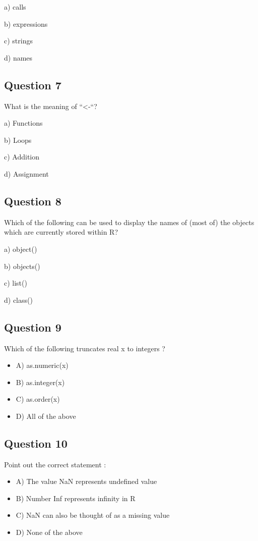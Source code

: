 \documentclass[11pt]{article}
\begin{document}
a) calls

b) expressions

c) strings

d) names

\subsection*{Question 7}
\label{sec:org28e303a}
What is the meaning of “<-“?

a) Functions

b) Loops

c) Addition

d) Assignment

\subsection*{Question 8}
\label{sec:orgcea9f26}
Which of the following can be used to display the names of (most of) the objects which are currently stored within R?

a) object()

b) objects()

c) list()

d) class()

\subsection*{Question 9}
\label{sec:org023b905}
Which of the following truncates real x to integers ?

\begin{itemize}
\item A) as.numeric(x)

\item B) as.integer(x)

\item C) as.order(x)

\item D) All of the above
\end{itemize}

\subsection*{Question 10}
\label{sec:orgcdb798c}
Point out the correct statement :

\begin{itemize}
\item A) The value NaN represents undefined value

\item B) Number Inf represents infinity in R

\item C) NaN can also be thought of as a missing value

\item D) None of the above
\end{itemize}
\end{document}
